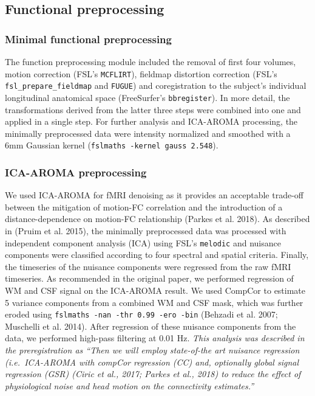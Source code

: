 \documentclass[
]{article}
\begin{document}
\hypertarget{functional-preprocessing}{%
\subsection{Functional preprocessing}\label{functional-preprocessing}}

\hypertarget{minimal-functional-preprocessing}{%
\subsubsection{Minimal functional preprocessing}\label{minimal-functional-preprocessing}}

The function preprocessing module included the removal of first four volumes, motion correction (FSL's \texttt{MCFLIRT}), fieldmap distortion correction (FSL's \texttt{fsl\_prepare\_fieldmap} and \texttt{FUGUE}) and coregistration to the subject's individual longitudinal anatomical space (FreeSurfer's \texttt{bbregister}). In more detail, the transformations derived from the latter three steps were combined into one and applied in a single step.
For further analysis and ICA-AROMA processing, the minimally preprocessed data were intensity normalized and smoothed with a 6mm Gaussian kernel (\texttt{fslmaths\ -kernel\ gauss\ 2.548}).

\hypertarget{ica-aroma-preprocessing}{%
\subsubsection{ICA-AROMA preprocessing}\label{ica-aroma-preprocessing}}

We used ICA-AROMA for fMRI denoising as it provides an acceptable trade-off between the mitigation of motion-FC correlation and the introduction of a distance-dependence on motion-FC relationship (Parkes et al. 2018). As described in (Pruim et al. 2015), the minimally preprocessed data was processed with independent component analysis (ICA) using FSL's \texttt{melodic} and nuisance components were classified according to four spectral and spatial criteria. Finally, the timeseries of the nuisance components were regressed from the raw fMRI timeseries.
As recommended in the original paper, we performed regression of WM and CSF signal on the ICA-AROMA result. We used CompCor to estimate 5 variance components from a combined WM and CSF mask, which was further eroded using \texttt{fslmaths\ -nan\ -thr\ 0.99\ -ero\ -bin} (Behzadi et al. 2007; Muschelli et al. 2014). After regression of these nuisance components from the data, we performed high-pass filtering at 0.01 Hz.
\emph{This analysis was described in the preregistration as ``Then we will employ state-of-the art nuisance regression (i.e.~ICA-AROMA with compCor regression (CC) and, optionally global signal regression (GSR) (Ciric et al., 2017; Parkes et al., 2018) to reduce the effect of physiological noise and head motion on the connectivity estimates.''}
\end{document}
